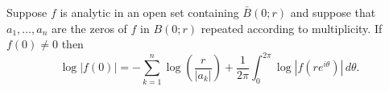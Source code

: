 Suppose $f$ is analytic in an open set containing $\bar{B}(0; r)$ and suppose that $a_1, \ldots, a_n$ are the zeros of $f$ in $B(0; r)$ repeated according to multiplicity. If $f(0) \neq 0$ then
$$
\log |f(0)| = -\sum_{k=1}^{n} \log \left( \frac{r}{|a_k|} \right) + \frac{1}{2\pi} \int_{0}^{2\pi} \log |f(re^{i\theta})| \, d\theta.
$$
